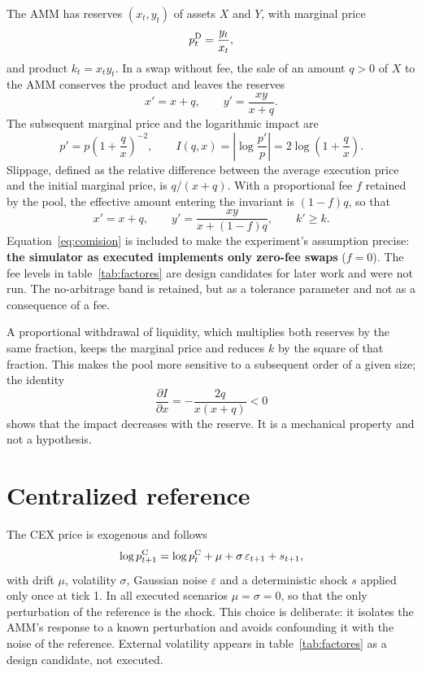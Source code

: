 The AMM has reserves $(x_t,y_t)$ of assets $X$ and $Y$, with marginal price
\begin{equation}
  p^{\mathrm{D}}_t = \frac{y_t}{x_t},
  \label{eq:precio}
\end{equation}
and product $k_t=x_ty_t$. In a swap without fee, the sale of an amount $q>0$ of $X$ to the AMM conserves the product and leaves the reserves
\begin{equation}
  x' = x+q,\qquad y' = \frac{xy}{x+q}.
  \label{eq:reservas}
\end{equation}
The subsequent marginal price and the logarithmic impact are
\begin{equation}
  p' = p\left(1+\frac{q}{x}\right)^{-2},\qquad I(q,x)=\left|\log\frac{p'}{p}\right| = 2\log\left(1+\frac{q}{x}\right).
  \label{eq:impacto}
\end{equation}
Slippage, defined as the relative difference between the average execution price and the initial marginal price, is $q/(x+q)$. With a proportional fee $f$ retained by the pool, the effective amount entering the invariant is $(1-f)q$, so that
\begin{equation}
  x'=x+q,\qquad y'=\frac{xy}{x+(1-f)q},\qquad k'\ge k.
  \label{eq:comision}
\end{equation}
Equation~\eqref{eq:comision} is included to make the experiment's assumption precise: \textbf{the simulator as executed implements only zero-fee swaps} ($f=0$). The fee levels in table~\ref{tab:factores} are design candidates for later work and were not run. The no-arbitrage band is retained, but as a tolerance parameter and not as a consequence of a fee.

A proportional withdrawal of liquidity, which multiplies both reserves by the same fraction, keeps the marginal price and reduces $k$ by the square of that fraction. This makes the pool more sensitive to a subsequent order of a given size; the identity
\begin{equation}
  \frac{\partial I}{\partial x} = -\frac{2q}{x(x+q)} <0
  \label{eq:dI}
\end{equation}
shows that the impact decreases with the reserve. It is a mechanical property and not a hypothesis.

\section{Centralized reference}

The CEX price is exogenous and follows
\begin{equation}
  \log p^{\mathrm{C}}_{t+1} = \log p^{\mathrm{C}}_t + \mu + \sigma\,\varepsilon_{t+1} + s_{t+1},
  \label{eq:cex}
\end{equation}
with drift $\mu$, volatility $\sigma$, Gaussian noise $\varepsilon$ and a deterministic shock $s$ applied only once at tick 1. In all executed scenarios $\mu=\sigma=0$, so that the only perturbation of the reference is the shock. This choice is deliberate: it isolates the AMM's response to a known perturbation and avoids confounding it with the noise of the reference. External volatility appears in table~\ref{tab:factores} as a design candidate, not executed.


